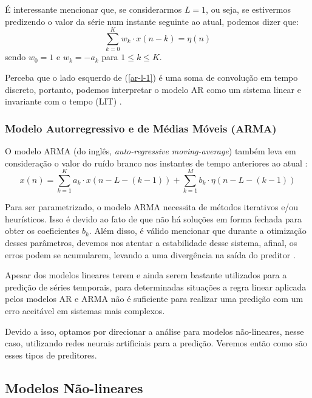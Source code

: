 \documentclass[a4paper, 12pt]{article}
\begin{document}
É interessante mencionar que, se considerarmos $L = 1$, ou seja, se estivermos predizendo o valor da série num instante seguinte ao atual, podemos dizer que:
\begin{equation}\label{ar-l-1}
\sum_{k=0}^{K} w_{k} \cdot x(n - k) = \eta (n)
\end{equation}
sendo $w_{0} = 1$ e $w_{k} = -a_{k}$ para $1 \leq k \leq K$.

Perceba que o lado esquerdo de (\ref{ar-l-1}) é uma soma de convolução em tempo discreto, portanto, podemos interpretar o modelo AR como um sistema linear e invariante com o tempo (LIT) \cite{haykin2008adaptive}.

\subsubsection{Modelo Autorregressivo e de Médias Móveis (ARMA)}

O modelo ARMA (do inglês, \textit{auto-regressive moving-average}) também leva em consideração o valor do ruído branco nos instantes de tempo anteriores ao atual \cite{box2015time}:
\begin{equation}
x(n) = \sum_{k = 1}^{K} a_{k} \cdot x(n - L - (k-1)) + \sum_{k=1}^{M} b_{k} \cdot \eta(n - L - (k-1))
\end{equation} 

Para ser parametrizado, o modelo ARMA necessita de métodos iterativos e/ou heurísticos. Isso é devido ao fato de que não há soluções em forma fechada para obter os coeficientes $b_k$. Além disso, é válido mencionar que durante a otimização desses parâmetros, devemos nos atentar a estabilidade desse sistema, afinal, os erros podem se acumularem, levando a uma divergência na saída do preditor \cite{box2015time}.

Apesar dos modelos lineares terem e ainda serem bastante utilizados para a predição de séries temporais, para determinadas situações a regra linear aplicada pelos modelos AR e ARMA não é suficiente para realizar uma predição com um erro aceitável em sistemas mais complexos. 

Devido a isso, optamos por direcionar a análise para modelos não-lineares, nesse caso, utilizando redes neurais artificiais para a predição. Veremos então como são esses tipos de preditores.

\subsection{Modelos Não-lineares}
\end{document}
